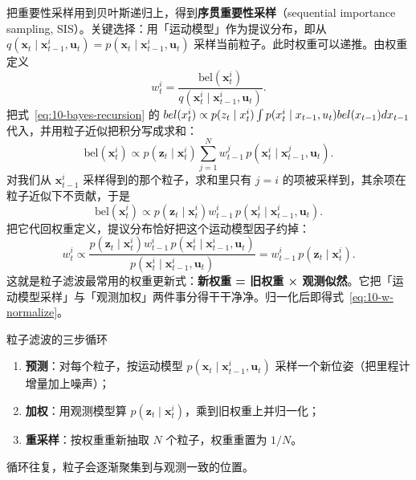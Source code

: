 把重要性采样用到贝叶斯递归上，得到\textbf{序贯重要性采样}（sequential importance sampling, SIS）。关键选择：用「运动模型」作为提议分布，即从 $q(\bm{x}_t\mid\bm{x}_{t-1}^{i},\bm{u}_t)=p(\bm{x}_t\mid\bm{x}_{t-1}^{i},\bm{u}_t)$ 采样当前粒子。此时权重可以递推。由权重定义
\begin{equation}
  w_t^{i} = \frac{\mathrm{bel}(\bm{x}_t^{i})}{q(\bm{x}_t^{i}\mid\bm{x}_{t-1}^{i},\bm{u}_t)}.
\end{equation}
把式~\eqref{eq:10-bayes-recursion} 的 $bel(x_t^{i})\propto p(z_t\mid x_t^{i})\int p(x_t^{i}\mid x_{t-1},u_t)bel(x_{t-1})dx_{t-1}$ 代入，并用粒子近似把积分写成求和：
\begin{equation}
  \mathrm{bel}(\bm{x}_t^{i}) \propto p\left(\bm{z}_t\mid\bm{x}_t^{i}\right)
  \sum_{j=1}^{N}w_{t-1}^{j}\,p\left(\bm{x}_t^{i}\mid\bm{x}_{t-1}^{j},\bm{u}_t\right).
\end{equation}
对我们从 $\bm{x}_{t-1}^{i}$ 采样得到的那个粒子，求和里只有 $j=i$ 的项被采样到，其余项在粒子近似下不贡献，于是
\begin{equation}
  \mathrm{bel}(\bm{x}_t^{i}) \propto p\left(\bm{z}_t\mid\bm{x}_t^{i}\right)w_{t-1}^{i}\,p\left(\bm{x}_t^{i}\mid\bm{x}_{t-1}^{i},\bm{u}_t\right).
\end{equation}
把它代回权重定义，提议分布恰好把这个运动模型因子约掉：
\begin{equation}
  w_t^{i} \propto \frac{p\left(\bm{z}_t\mid\bm{x}_t^{i}\right)w_{t-1}^{i}\,p\left(\bm{x}_t^{i}\mid\bm{x}_{t-1}^{i},\bm{u}_t\right)}{p\left(\bm{x}_t^{i}\mid\bm{x}_{t-1}^{i},\bm{u}_t\right)}
  = w_{t-1}^{i}\,p\left(\bm{z}_t\mid\bm{x}_t^{i}\right).
  \label{eq:10-weight-recursion}
\end{equation}
这就是粒子滤波最常用的权重更新式：\textbf{新权重 = 旧权重 × 观测似然}。它把「运动模型采样」与「观测加权」两件事分得干干净净。归一化后即得式~\eqref{eq:10-w-normalize}。

\begin{keybox}{粒子滤波的三步循环}
\begin{enumerate}
  \item \textbf{预测}：对每个粒子，按运动模型 $p(\bm{x}_t\mid\bm{x}_{t-1}^{i},\bm{u}_t)$ 采样一个新位姿（把里程计增量加上噪声）；
  \item \textbf{加权}：用观测模型算 $p(\bm{z}_t\mid\bm{x}_t^{i})$，乘到旧权重上并归一化；
  \item \textbf{重采样}：按权重重新抽取 $N$ 个粒子，权重重置为 $1/N$。
\end{enumerate}
循环往复，粒子会逐渐聚集到与观测一致的位置。
\end{keybox}

